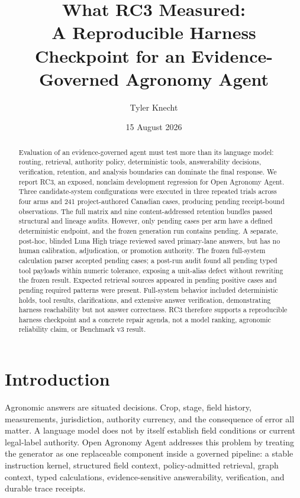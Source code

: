\documentclass[9pt,twocolumn]{article}
\title{What RC3 Measured:\\A Reproducible Harness Checkpoint for an Evidence-Governed Agronomy Agent}
\author{Tyler Knecht}
\date{15 August 2026}
\newcommand{\system}{Open Agronomy Agent}
\newcommand{\RCObservations}{pending}
\newcommand{\RCScoredCases}{pending}
\newcommand{\RCSemanticJudgments}{pending}
\newcommand{\RCRetrievalSource}{pending}
\newcommand{\RCRetrievalPattern}{pending}
\newcommand{\RCCanonicalCalc}{pending}
\newcommand{\RCToolAudit}{pending}
\begin{document}
\raggedbottom
\maketitle

\begin{abstract}
Evaluation of an evidence-governed agent must test more than its language model: routing, retrieval, authority policy, deterministic tools, answerability decisions, verification, retention, and analysis boundaries can dominate the final response. We report RC3, an exposed, nonclaim development regression for \system{}. Three candidate-system configurations were executed in three repeated trials across four arms and 241 project-authored Canadian cases, producing \RCObservations{} receipt-bound observations. The full matrix and nine content-addressed retention bundles passed structural and lineage audits. However, only \RCScoredCases{} cases per arm have a defined deterministic endpoint, and the frozen generation run contains \RCSemanticJudgments{}. A separate, post-hoc, blinded Luna High triage reviewed \RCPosthocSemanticJudgments{} saved primary-lane answers, but has no human calibration, adjudication, or promotion authority. The frozen full-system calculation parser accepted \RCCanonicalCalc{} cases; a post-run audit found all \RCToolAudit{} typed tool payloads within numeric tolerance, exposing a unit-alias defect without rewriting the frozen result. Expected retrieval sources appeared in \RCRetrievalSource{} positive cases and \RCRetrievalPattern{} required patterns were present. Full-system behavior included deterministic holds, tool results, clarifications, and extensive answer verification, demonstrating harness reachability but not answer correctness. RC3 therefore supports a reproducible harness checkpoint and a concrete repair agenda, not a model ranking, agronomic reliability claim, or Benchmark v3 result.
\end{abstract}

\section{Introduction}

Agronomic answers are situated decisions. Crop, stage, field history, measurements, jurisdiction, authority currency, and the consequence of error all matter. A language model does not by itself establish field conditions or current legal-label authority. \system{} addresses this problem by treating the generator as one replaceable component inside a governed pipeline: a stable instruction kernel, structured field context, policy-admitted retrieval, graph context, typed calculations, evidence-sensitive answerability, verification, and durable trace receipts.
\end{document}
